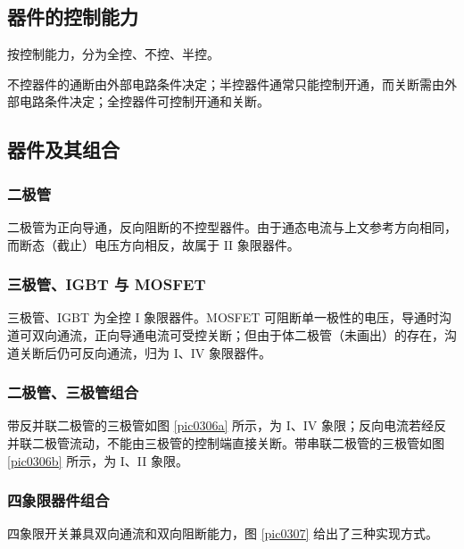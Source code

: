\subsection{器件的控制能力}

按控制能力，分为全控、不控、半控。

不控器件的通断由外部电路条件决定；半控器件通常只能控制开通，而关断需由外部电路条件决定；全控器件可控制开通和关断。

\subsection{器件及其组合}

\subsubsection{二极管}

二极管为正向导通，反向阻断的不控型器件。由于通态电流与上文参考方向相同，而断态（截止）电压方向相反，故属于 II 象限器件。


\subsubsection{三极管、IGBT 与 MOSFET}

三极管、IGBT 为全控 I 象限器件。MOSFET 可阻断单一极性的电压，导通时沟道可双向通流，正向导通电流可受控关断；但由于体二极管（未画出）的存在，沟道关断后仍可反向通流，归为 I、IV 象限器件。


\subsubsection{二极管、三极管组合}

带反并联二极管的三极管如图 \ref{pic0306a} 所示，为 I、IV 象限；反向电流若经反并联二极管流动，不能由三极管的控制端直接关断。带串联二极管的三极管如图 \ref{pic0306b} 所示，为 I、II 象限。


\subsubsection{四象限器件组合}

四象限开关兼具双向通流和双向阻断能力，图 \ref{pic0307} 给出了三种实现方式。


